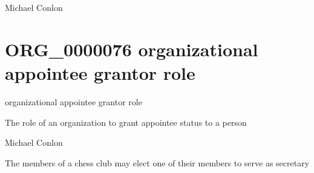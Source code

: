 \documentclass[letterpaper,10pt,english]{sphinxmanual}
\begin{document}
\begin{sphinxShadowBox}

\sphinxAtStartPar
Michael Conlon 
\end{sphinxShadowBox}
\begin{quote}
\label{\detokenize{doc-ORG_0000076:org-0000076}}\label{\detokenize{doc-ORG_0000076:organizational-appointee-grantor-role}}\label{\detokenize{doc-ORG_0000076:org-0000076}}
\ignorespaces \end{quote}


\section{ORG\_0000076 \sphinxhyphen{} organizational appointee grantor role}
\label{\detokenize{doc-ORG_0000076:org-0000076-organizational-appointee-grantor-role}}\label{\detokenize{doc-ORG_0000076:index-0}}\label{\detokenize{doc-ORG_0000076::doc}}
\begin{sphinxShadowBox}

\sphinxAtStartPar
organizational appointee grantor role
\end{sphinxShadowBox}

\begin{sphinxShadowBox}

\sphinxAtStartPar
The role of an organization to grant appointee status to a person
\end{sphinxShadowBox}

\begin{sphinxShadowBox}

\sphinxAtStartPar
Michael Conlon 
\end{sphinxShadowBox}

\begin{sphinxShadowBox}

\sphinxAtStartPar
The members of a chess club may elect one of their members to serve as secretary
\end{sphinxShadowBox}
\end{document}

